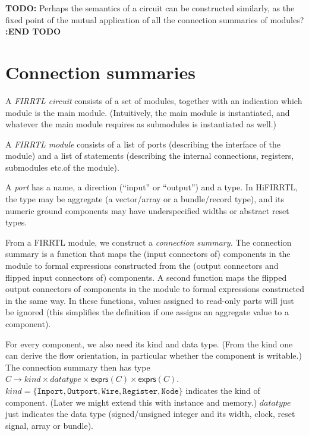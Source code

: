 \documentclass[a4paper]{article}
\newcommand{\expressions}{\mathsf{exprs}}
\begin{document}
\textbf{TODO:} Perhaps the semantics of a circuit can be constructed similarly, as the fixed point of the mutual application of all the connection summaries of modules? \textbf{:END TODO}

\section{Connection summaries}

A \emph{FIRRTL circuit} consists of a set of modules, together with an indication which module is the main module.
(Intuitively, the main module is instantiated, and whatever the main module requires as submodules is instantiated as well.)

A \emph{FIRRTL module} consists of a list of ports (describing the interface of the module) and a list of statements (describing the internal connections, registers, submodules etc.\@ of the module).

A \emph{port} has a name, a direction (``input'' or ``output'') and a type.
In HiFIRRTL, the type may be aggregate (a vector/array or a bundle/record type), and its numeric ground components may have underspecified widths or abstract reset types.

From a FIRRTL module, we construct a \emph{connection summary.}
The connection summary is a function that maps the (input connectors of) components in the module to formal expressions constructed from the (output connectors and flipped input connectors of) components.
A second function maps the flipped output connectors of components in the module to formal expressions constructed in the same way.
In these functions, values assigned to read-only parts will just be ignored
(this simplifies the definition if one assigns an aggregate value to a component).

For every component, we also need its kind and data type.
(From the kind one can derive the flow orientation, in particular whether the component is writable.)
The connection summary then has type $C \to \mathit{kind} \times \mathit{datatype} \times \expressions(C) \times \expressions(C)$.
$\mathit{kind} = \{ \mathtt{Inport}, \mathtt{Outport}, \mathtt{Wire}, \mathtt{Register}, \mathtt{Node} \}$ indicates the kind of component.
(Later we might extend this with instance and memory.)
$\mathit{datatype}$ just indicates the data type (signed/unsigned integer and its width, clock, reset signal, array or bundle).
\end{document}
